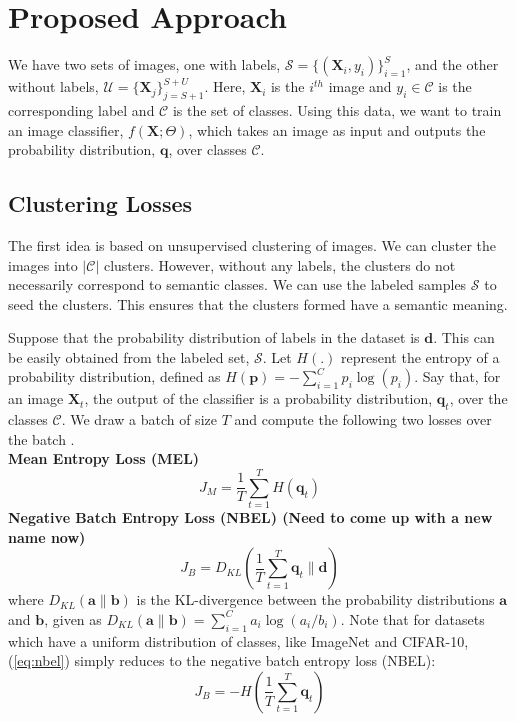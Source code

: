 \section{Proposed Approach}

We have two sets of images, one with labels, $\mathcal{S} = \{(\mathbf{X}_i, y_i)\}_{i=1}^S$, and 
the other without labels, $\mathcal{U} = \{\mathbf{X}_j\}_{j=S+1}^{S+U}$. Here, $\mathbf{X}_i$ is the
$i^{th}$ image and $y_i \in \mathcal{C}$ is the corresponding label and $\mathcal{C}$ is the set of
classes.  Using this data, we want to train an image classifier, $f(\mathbf{X}; \Theta)$,
which takes an image as input and outputs the probability distribution, $\mathbf{q}$, over classes
$\mathcal{C}$.

\subsection{Clustering Losses}

The first idea is based on unsupervised clustering of images. We can cluster the images into
$|\mathcal{C}|$ clusters. However, without any labels, the clusters do not necessarily
correspond to semantic classes. We can use the labeled samples $\mathcal{S}$ to seed the clusters.
This ensures that the clusters formed have a semantic meaning.

Suppose that the probability distribution of labels in the dataset is $\mathbf{d}$. This can be
easily obtained from the labeled set, $\mathcal{S}$.  Let $H(.)$ represent the entropy of a
probability distribution, defined as $H(\mathbf{p}) = -\sum_{i=1}^{C}p_i \log(p_i)$.  Say that, for
an image $\mathbf{X}_t$, the output of the classifier is a probability distribution, $\mathbf{q}_t$,
over the classes $\mathcal{C}$. We draw a batch of size $T$ and compute the following two losses
over the batch \cite{subic}.\\
\newline
\textbf{Mean Entropy Loss (MEL)}
\begin{equation}
	J_M = \frac{1}{T}\sum_{t=1}^{T}H(\mathbf{q}_t)
\end{equation}
\textbf{Negative Batch Entropy Loss (NBEL) (Need to come up with a new name now)}
\begin{equation}
	\label{eq:nbel}
	J_B = D_{KL} (\frac{1}{T}\sum_{t=1}^{T}\mathbf{q}_t \lVert \mathbf{d})
\end{equation}
where $D_{KL}(\mathbf{a} \lVert	\mathbf{b})$ is the KL-divergence between the probability
distributions $\mathbf{a}$ and $\mathbf{b}$, given as $D_{KL}(\mathbf{a} \lVert \mathbf{b}) =
\sum_{i=1}^{C}a_i \log(a_i / b_i)$. Note that for datasets which have a uniform distribution of
classes, like ImageNet and CIFAR-10, (\ref{eq:nbel}) simply reduces to the negative batch
entropy loss (NBEL):
\begin{equation}
	J_B = -H(\frac{1}{T}\sum_{t=1}^{T}\mathbf{q}_t)
\end{equation}


